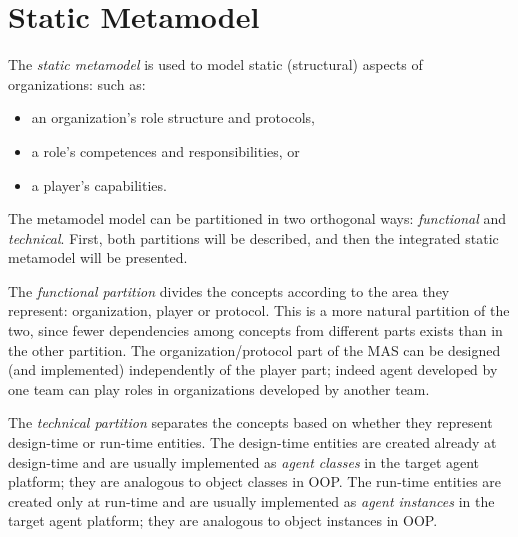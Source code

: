 
\section{Static Metamodel}

The \textit{static metamodel} is used to model static (structural) aspects of organizations: such as:
\begin{itemize}
	\item an organization's role structure and protocols,
	\item a role's competences and responsibilities, or
	\item a player's capabilities.
\end{itemize}

The metamodel model can be partitioned in two orthogonal ways: \textit{functional} and \textit{technical}.
First, both partitions will be described, and then the integrated static metamodel will be presented.

The \textit{functional partition} divides the concepts according to the area they represent: organization, player or protocol.
This is a more natural partition of the two, since fewer dependencies among concepts from different parts exists than in the other partition.
The organization/protocol part of the MAS can be designed (and implemented) independently of the player part; indeed agent developed by one team can play roles in organizations developed by another team.

The \textit{technical partition} separates the concepts based on whether they represent design-time or run-time entities.
The design-time entities are created already at design-time and are usually implemented as \textit{agent classes} in the target agent platform; they are analogous to object classes in OOP.
The run-time entities are created only at run-time and are usually implemented as \textit{agent instances} in the target agent platform; they are analogous to object instances in OOP.

